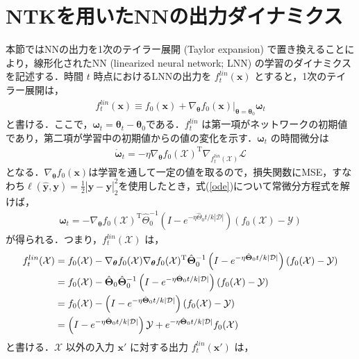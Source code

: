 \section{NTKを用いたNNの出力ダイナミクス}
\label{NTK_dynamics}
本節ではNNの出力を1次のテイラー展開 (Taylor expansion) で置き換えることにより，線形化されたNN (linearized neural network; LNN) の学習のダイナミクスを記述する．時間 $t$ 時点におけるLNNの出力を $f_t^{lin}(\bm{x})$ とすると，1次のテイラー展開は，
\begin{align}
    f_t^{lin}(\bm{x}) \equiv f_0(\bm{x}) + \nabla_{\bm{\theta}}f_0(\bm{x})|_{\bm{\theta}=\bm{\theta}_0}\bm{\omega}_t \label{f_t_lin}
\end{align}
と書ける．ここで，$\bm{\omega}_t=\bm{\theta}_t - \bm{\theta}_0$である．$f_t^{lin}$ は第一項がネットワークの初期値であり，第二項が学習中の初期値からの値の変化を示す．$\bm{\omega}_t$ の時間微分は
\begin{align}
    \dot{\bm{\omega}}_t = -\eta \nabla_{\bm{\theta}}f_0(\mathcal{X})^{\mathrm{T}}\nabla_{f_t^{lin}(\mathcal{X})}\mathcal{L} \label{ode}
\end{align}
となる．$\nabla_{\bm{\theta}}f_0(\bm{x})$は学習を通して一定の値を取るので，損失関数にMSE，すなわち$\ell(\hat{\bm{y}},\bm{y}) = \frac{1}{2}|\hat{\bm{y}}-\bm{y}|_2^2$を使用したとき，式(\ref{ode})について常微分方程式を解けば，
\begin{align}
    \bm{\omega}_t = -\nabla_{\bm{\theta}}f_0(\mathcal{X})^{\mathrm{T}}\hat{\Theta}_{0}^{-1}\left(I - e^{-\eta\hat{\Theta}_0 t/k|\mathcal{D}|}\right)(f_0(\mathcal{X})- \mathcal{Y})
\end{align}
が得られる．つまり，$f_t^{lin}(\mathcal{X})$ は，
\begin{align}
    f_t^{lin}(\mathcal{X}) &= f_0(\mathcal{X}) - \nabla_{\bm{\theta}}f_0(\mathcal{X})\nabla_{\bm{\theta}}f_0(\mathcal{X})^{\mathrm{T}}\hat{\bm{\Theta}}_{0}^{-1}\left(I - e^{-\eta\hat{\bm{\Theta}}_0 t/k|\mathcal{D}|}\right)(f_0(\mathcal{X})- \mathcal{Y}) \\
    &= f_0(\mathcal{X}) - \hat{\bm{\Theta}}_0 \hat{\bm{\Theta}}_0^{-1}\left(I - e^{-\eta\hat{\bm{\Theta}}_0 t/k|\mathcal{D}|}\right)(f_0(\mathcal{X})- \mathcal{Y}) \\
    &= f_0(\mathcal{X}) - \left(I - e^{-\eta\hat{\bm{\Theta}}_0 t/k|\mathcal{D}|}\right)(f_0(\mathcal{X})- \mathcal{Y}) \\
    &= \left(I - e^{-\eta\hat{\bm{\Theta}}_0 t/k|\mathcal{D}|}\right)\mathcal{Y} + e^{-\eta\hat{\bm{\Theta}}_0 t/k|\mathcal{D}|}f_0(\mathcal{X}) \label{ntk_output}
\end{align}
と書ける．$\mathcal{X}$ 以外の入力 $\bm{x}'$ に対する出力 $f_t^{lin}(\bm{x}')$ は，
